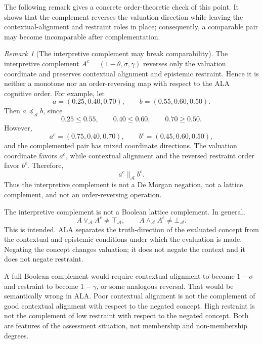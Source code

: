 \documentclass[reqno,final]{amsart}
\theoremstyle{definition}
\theoremstyle{plain}
\theoremstyle{remark}
\newtheorem{remark}{Remark}
\providecommand{\cA}{\mathcal{A}}
\providecommand{\preceqA}{\preceq_{\mathcal A}}
\providecommand{\parallelA}{\parallel_{\mathcal A}}
\begin{document}
The following remark gives a concrete order-theoretic check of this point. It shows that the complement reverses the valuation direction while leaving the contextual-alignment and restraint roles in place; consequently, a comparable pair may become incomparable after complementation.

\begin{remark}[The interpretive complement may break comparability]
The interpretive complement \(A^c=(1-\theta,\sigma,\gamma)\) reverses only the valuation coordinate and preserves contextual alignment and epistemic restraint. Hence it is neither a monotone nor an order-reversing map with respect to the ALA cognitive order. For example, let
\[
a=(0.25,0.40,0.70),\qquad b=(0.55,0.60,0.50).
\]
Then \(a\preceqA b\), since
\[
0.25\le 0.55,\qquad 0.40\le 0.60,\qquad 0.70\ge 0.50.
\]
However,
\[
a^c=(0.75,0.40,0.70),\qquad b^c=(0.45,0.60,0.50),
\]
and the complemented pair has mixed coordinate directions. The valuation coordinate favors \(a^c\), while contextual alignment and the reversed restraint order favor \(b^c\). Therefore,
\[
a^c\parallelA b^c.
\]
Thus the interpretive complement is not a De Morgan negation, not a lattice complement, and not an order-reversing operation.
\end{remark}

The interpretive complement is not a Boolean lattice complement. In general,
\[
A\vee_{\cA}A^c\neq \top_{\cA},
\qquad
A\wedge_{\cA}A^c\neq \bot_{\cA}.
\]
This is intended. ALA separates the truth-direction of the evaluated concept from the contextual and epistemic conditions under which the evaluation is made. Negating the concept changes valuation; it does not negate the context and it does not negate restraint.

A full Boolean complement would require contextual alignment to become \(1-\sigma\) and restraint to become \(1-\gamma\), or some analogous reversal. That would be semantically wrong in ALA. Poor contextual alignment is not the complement of good contextual alignment with respect to the negated concept. High restraint is not the complement of low restraint with respect to the negated concept. Both are features of the assessment situation, not membership and non-membership degrees.
\end{document}

